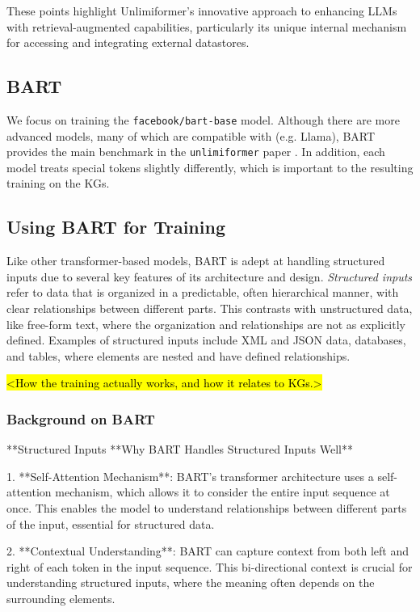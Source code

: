 \documentclass[12pt]{article}
\begin{document}
These points highlight Unlimiformer's innovative approach to enhancing LLMs with retrieval-augmented capabilities, particularly its unique internal mechanism for accessing and integrating external datastores.


\subsection*{BART}
We focus on training the \texttt{facebook/bart-base} model. Although there are more advanced models, many of which are compatible with  (e.g. Llama), BART provides the main benchmark in the \texttt{unlimiformer} paper \cite{bertsch2023unlimiformer}. In addition, each model treats special tokens slightly differently, which is important to the resulting training on the KGs.


\subsection*{Using BART for Training}
Like other transformer-based models, BART is adept at handling structured inputs due to several key features of its architecture and design. \emph{Structured inputs} refer to data that is organized in a predictable, often hierarchical manner, with clear relationships between different parts. This contrasts with unstructured data, like free-form text, where the organization and relationships are not as explicitly defined. Examples of structured inputs include XML and JSON data, databases, and tables, where elements are nested and have defined relationships.


\hl{<How the training actually works, and how it relates to KGs.>}


\subsubsection{Background on BART}
**Structured Inputs
**Why BART Handles Structured Inputs Well**


1. **Self-Attention Mechanism**: BART's transformer architecture uses a self-attention mechanism, which allows it to consider the entire input sequence at once. This enables the model to understand relationships between different parts of the input, essential for structured data.


2. **Contextual Understanding**: BART can capture context from both left and right of each token in the input sequence. This bi-directional context is crucial for understanding structured inputs, where the meaning often depends on the surrounding elements.
\end{document}
